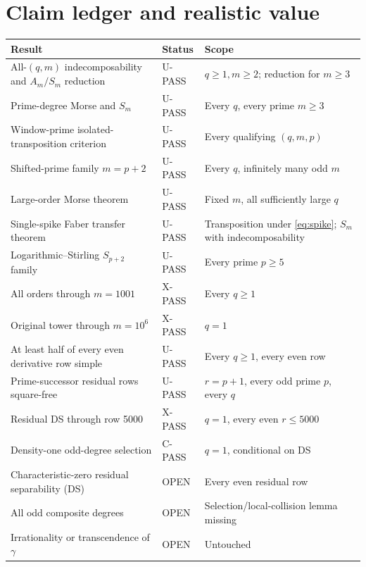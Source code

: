 \documentclass[11pt]{article}
\theoremstyle{keio}
\theoremstyle{keioinput}
\newcommand{\UPASS}{\textcolor{passgreen}{\textsf{U-PASS}}}
\newcommand{\XPASS}{\textcolor{xpassblue}{\textsf{X-PASS}}}
\newcommand{\CPASS}{\textcolor{cpassviolet}{\textsf{C-PASS}}}
\newcommand{\OPEN}{\textcolor{openred}{\textsf{OPEN}}}
\begin{document}
\section{Claim ledger and realistic value}

\begin{center}
\small
\begin{tabularx}{\textwidth}{@{}>{\raggedright\arraybackslash}X>{\centering\arraybackslash}p{}>{\raggedright\arraybackslash}p{}@{}}
\toprule
\textbf{Result} & \textbf{Status} & \textbf{Scope}\\
\midrule
All-$(q,m)$ indecomposability and $A_m/S_m$ reduction & \UPASS & $q\ge1,m\ge2$; reduction for $m\ge3$\\
Prime-degree Morse and $S_m$ & \UPASS & Every $q$, every prime $m\ge3$\\
Window-prime isolated-transposition criterion & \UPASS & Every qualifying $(q,m,p)$\\
Shifted-prime family $m=p+2$ & \UPASS & Every $q$, infinitely many odd $m$\\
Large-order Morse theorem & \UPASS & Fixed $m$, all sufficiently large $q$\\
Single-spike Faber transfer theorem & \UPASS & Transposition under \eqref{eq:spike}; $S_m$ with indecomposability\\
Logarithmic--Stirling $S_{p+2}$ family & \UPASS & Every prime $p\ge5$\\
All orders through $m=1001$ & \XPASS & Every $q\ge1$\\
Original tower through $m=10^6$ & \XPASS & $q=1$\\
At least half of every even derivative row simple & \UPASS & Every $q\ge1$, every even row\\
Prime-successor residual rows square-free & \UPASS & $r=p+1$, every odd prime $p$, every $q$\\
Residual DS through row 5000 & \XPASS & $q=1$, every even $r\le5000$\\
Density-one odd-degree selection & \CPASS & $q=1$, conditional on DS\\
Characteristic-zero residual separability (DS) & \OPEN & Every even residual row\\
All odd composite degrees & \OPEN & Selection/local-collision lemma missing\\
Irrationality or transcendence of $\gamma$ & \OPEN & Untouched\\
\bottomrule
\end{tabularx}
\end{center}
\end{document}
